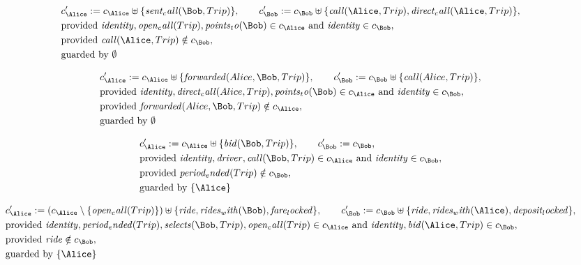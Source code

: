 \begin{align*}
&
c'_
{
\Alice
}
 := 
c_
{
\Alice
}
 \uplus 
\{
\mathit{
sent_call
}
(
\Bob
,
Trip
)
\}
, \qquad 
c'_
{
\Bob
}
 := 
c_
{
\Bob
}
 \uplus 
\{
\mathit{
call
}
(
\Alice
,
Trip
)
,
\mathit{
direct_call
}
(
\Alice
,
Trip
)
\}
,\\
&
\text{provided } 
\mathit{
identity
}
,
\mathit{
open_call
}
(
Trip
)
,
\mathit{
points_to
}
(
\Bob
)
 \in c_
{
\Alice
}
 \text{ and } 
\mathit{
identity
}
 \in c_
{
\Bob
}
,\\
&
\text{provided } 
\mathit{
call
}
(
\Alice
,
Trip
)
 \notin c_
{
\Bob
}
,\\
&
\text{guarded by } \emptyset
\end{align*}

\begin{align*}
&
c'_
{
\Alice
}
 := 
c_
{
\Alice
}
 \uplus 
\{
\mathit{
forwarded
}
(
Alice
,
\Bob
,
Trip
)
\}
, \qquad 
c'_
{
\Bob
}
 := 
c_
{
\Bob
}
 \uplus 
\{
\mathit{
call
}
(
Alice
,
Trip
)
\}
,\\
&
\text{provided } 
\mathit{
identity
}
,
\mathit{
direct_call
}
(
Alice
,
Trip
)
,
\mathit{
points_to
}
(
\Bob
)
 \in c_
{
\Alice
}
 \text{ and } 
\mathit{
identity
}
 \in c_
{
\Bob
}
,\\
&
\text{provided } 
\mathit{
forwarded
}
(
Alice
,
\Bob
,
Trip
)
 \notin c_
{
\Alice
}
,\\
&
\text{guarded by } \emptyset
\end{align*}

\begin{align*}
&
c'_
{
\Alice
}
 := 
c_
{
\Alice
}
 \uplus 
\{
\mathit{
bid
}
(
\Bob
,
Trip
)
\}
, \qquad 
c'_
{
\Bob
}
 := 
c_
{
\Bob
}
,\\
&
\text{provided } 
\mathit{
identity
}
,
\mathit{
driver
}
,
\mathit{
call
}
(
\Bob
,
Trip
)
 \in c_
{
\Alice
}
 \text{ and } 
\mathit{
identity
}
 \in c_
{
\Bob
}
,\\
&
\text{provided } 
\mathit{
period_ended
}
(
Trip
)
 \notin c_
{
\Bob
}
,\\
&
\text{guarded by } \{
\Alice
\}
\end{align*}

\begin{align*}
&
c'_
{
\Alice
}
 := 
(c_
{
\Alice
}
 \setminus 
\{
\mathit{
open_call
}
(
Trip
)
\}
) \uplus 
\{
\mathit{
ride
}
,
\mathit{
rides_with
}
(
\Bob
)
,
\mathit{
fare_locked
}
\}
, \qquad 
c'_
{
\Bob
}
 := 
c_
{
\Bob
}
 \uplus 
\{
\mathit{
ride
}
,
\mathit{
rides_with
}
(
\Alice
)
,
\mathit{
deposit_locked
}
\}
,\\
&
\text{provided } 
\mathit{
identity
}
,
\mathit{
period_ended
}
(
Trip
)
,
\mathit{
selects
}
(
\Bob
,
Trip
)
,
\mathit{
open_call
}
(
Trip
)
 \in c_
{
\Alice
}
 \text{ and } 
\mathit{
identity
}
,
\mathit{
bid
}
(
\Alice
,
Trip
)
 \in c_
{
\Bob
}
,\\
&
\text{provided } 
\mathit{
ride
}
 \notin c_
{
\Bob
}
,\\
&
\text{guarded by } \{
\Alice
\}
\end{align*}
